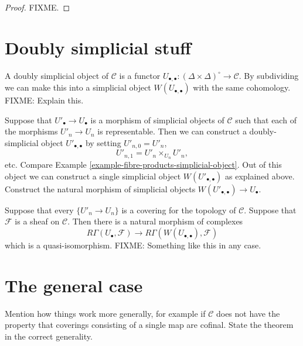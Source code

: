 \begin{proof}
FIXME.
\end{proof}


\section{Doubly simplicial stuff}
\label{section-doubly-simplicial}

\noindent
A doubly simplicial object of $\mathcal{C}$ is a functor
$U_{\bullet,\bullet} : (\Delta\times\Delta)^\circ \to \mathcal{C}$.
By subdividing we can make this into a simplicial object 
$W(U_{\bullet,\bullet})$ with the same cohomology. FIXME: Explain this.

\noindent
Suppose that $U'_\bullet \to U_\bullet$ is a morphism of simplicial
objects of $\mathcal{C}$ such that each of the morphisms $U'_n \to
U_n$ is representable. Then we can construct a doubly-simplicial
object $U'_{\bullet,\bullet}$ by setting $U'_{n,0}= U'_n$,
$$
U'_{n,1} = U'_n \times_{U_n} U'_n,
$$
etc. Compare Example \ref{example-fibre-products-simplicial-object}. 
Out of this object we can construct a single simplicial object
$W(U'_{\bullet,\bullet})$ as explained above. Construct the 
natural morphism of simplicial objects 
$W(U'_{\bullet,\bullet}) \to U_\bullet$.

\begin{lemma}
Suppose that every $\{U'_n \to U_n\}$ is a covering for the topology
of $\mathcal{C}$. Suppose that $\mathcal{F}$ is a sheaf on 
$\mathcal{C}$. Then there is a natural
morphism of complexes
$$
R\Gamma(U_\bullet, \mathcal{F}) \to 
R\Gamma(W(U_{\bullet,\bullet}), \mathcal{F})
$$
which is a quasi-isomorphism. FIXME: Something like this in any case.
\end{lemma}

\section{The general case}

\noindent
Mention how things work more generally, for example if $\mathcal{C}$
does not have the property that coverings consisting of a single map
are cofinal. State the theorem in the correct generality.







